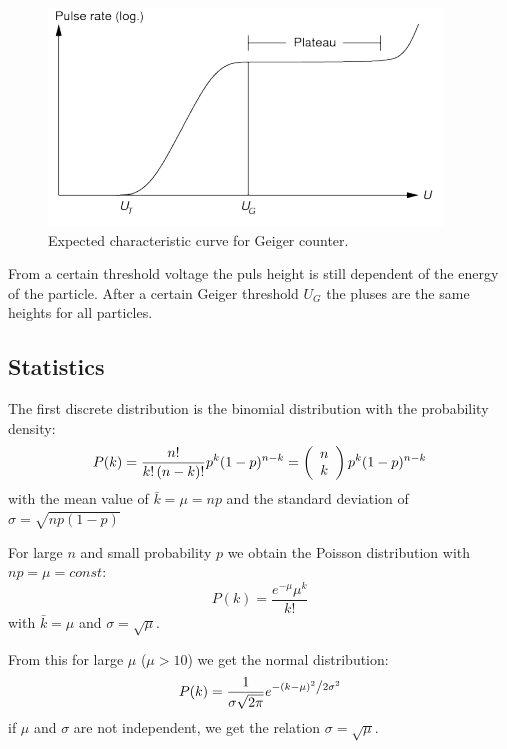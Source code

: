 \begin{figure}[H]
\centering
\includegraphics[width=\textwidth]{../Figures/Geiger.PNG}
\caption{Expected characteristic curve for Geiger counter.}
\label{fig:Geiger}
\end{figure}

From a certain threshold voltage the puls height is still dependent of the energy of the particle. After a certain Geiger threshold $U_G$ the pluses are the same heights for all particles.

\subsection{Statistics}

The first discrete distribution is the binomial distribution with the probability density:
$$ P(k) = \frac{{n!}}{{k!\left( {n - k} \right)!}}p^k (1-p)^{n - k} = \left( {\begin{array}{*{20}c} n \\ k \\ \end{array}} \right)p^k (1-p)^{n - k}$$
with the mean value of $\bar{k}=\mu=np$ and the standard deviation of $\sigma=\sqrt{np(1-p)}$

For large $n$ and small probability $p$ we obtain the Poisson distribution with $np= \mu=const$:
$$P\left( k \right) = \frac{{e^{ - \mu } \mu ^k }}{{k!}}$$
with $\bar{k}=\mu$ and $\sigma=\sqrt{\mu}$.

From this for large $\mu$ ($\mu>10$) we get the normal distribution:
$$P(k) = \frac{1}{{\sigma \sqrt {2\pi } }}e^{{{ - \left( {k - \mu } \right)^2 } \mathord{\left/ {\vphantom {{ - \left( {k - \mu } \right)^2 } {2\sigma ^2 }}} \right. \kern-\nulldelimiterspace} {2\sigma ^2 }}}$$
if $\mu$ and $\sigma$ are not independent, we get the relation $\sigma =\sqrt{\mu}$.

